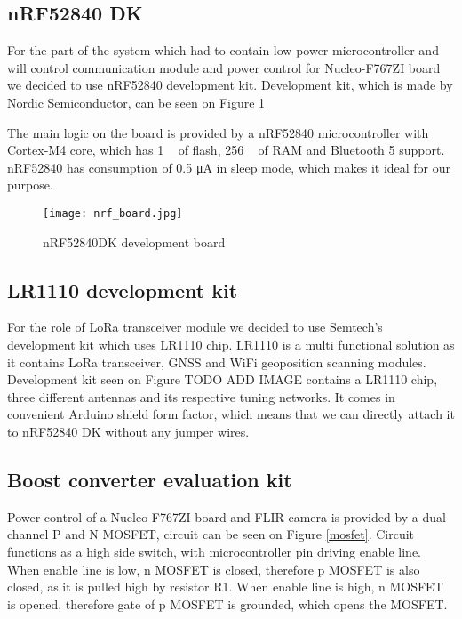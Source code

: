 \subsection{ nRF52840 DK}

For the part of the system which had to contain low power microcontroller and will control communication module and power control for Nucleo-F767ZI board we decided to use nRF52840 development kit.
Development kit, which is made by Nordic Semiconductor, can be seen on Figure \ref{nrf_board}

The main logic on the board is provided by a nRF52840 microcontroller with Cortex-M4 core, which has 1 \si{\mega\byte} of flash, 256 \si{\kilo\byte} of RAM and Bluetooth 5 support.
nRF52840 has consumption of 0.5 \si{\micro\ampere} in sleep mode, which makes it ideal for our purpose.

\begin{figure}[ht]
        \centering
        \texttt{[image: nrf\_board.jpg]} 
        \caption{ nRF52840DK development board}
        \label{nrf_board}
\end{figure}

\subsection{ LR1110 development kit}

For the role of LoRa transceiver module we decided to use Semtech's development kit which uses LR1110 chip.
LR1110 is a multi functional solution as it contains LoRa transceiver, GNSS and WiFi geoposition scanning modules.
Development kit seen on Figure TODO ADD IMAGE contains a LR1110 chip, three different antennas and its respective tuning networks.
It comes in convenient Arduino shield form factor, which means that we can directly attach it to nRF52840 DK without any jumper wires.


\subsection{ Boost converter evaluation kit}

Power control of a Nucleo-F767ZI board and FLIR camera is provided by a dual channel P and N MOSFET, circuit can be seen on Figure \ref{mosfet}.
Circuit functions as a high side switch, with microcontroller pin driving enable line.
When enable line is low, n MOSFET is closed, therefore p MOSFET is also closed, as it is pulled high by resistor R1.
When enable line is high, n MOSFET is opened, therefore gate of p MOSFET is grounded, which opens the MOSFET.

